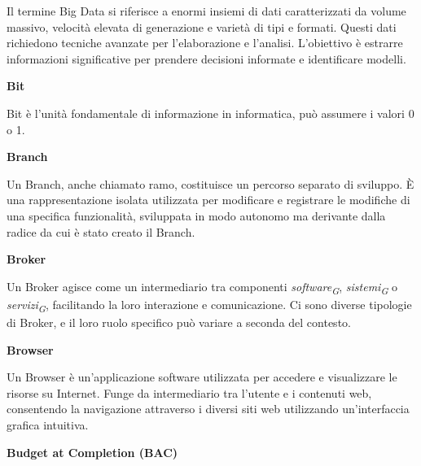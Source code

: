 \documentclass{article}
\begin{document}
Il termine Big Data si riferisce a enormi insiemi di dati caratterizzati da volume massivo, velocità elevata di generazione e varietà di tipi e formati. Questi dati richiedono tecniche avanzate per l'elaborazione e l'analisi. L'obiettivo è estrarre informazioni significative per prendere decisioni informate e identificare modelli.

\vspace{0.4cm}

\textbf{Bit}

\vspace{0.1cm}

Bit è l'unità fondamentale di informazione in informatica, può assumere i valori 0 o 1. 

\vspace{0.4cm}

\textbf{Branch}

\vspace{0.1cm}

Un Branch, anche chiamato ramo, costituisce un percorso separato di sviluppo. È una rappresentazione isolata utilizzata per modificare e registrare le modifiche di una specifica funzionalità, sviluppata in modo autonomo ma derivante dalla radice da cui è stato creato il Branch.

\vspace{0.4cm}

\textbf{Broker}

\vspace{0.1cm}

Un Broker agisce come un intermediario tra componenti \textit{software}\textsubscript{\textit{G}}, \textit{sistemi}\textsubscript{\textit{G}} o \textit{servizi}\textsubscript{\textit{G}}, facilitando la loro interazione e comunicazione. Ci sono diverse tipologie di Broker, e il loro ruolo specifico può variare a seconda del contesto.

\vspace{0.4cm}

\textbf{Browser}

\vspace{0.1cm}

Un Browser è un'applicazione software utilizzata per accedere e visualizzare le risorse su Internet. Funge da intermediario tra l'utente e i contenuti web, consentendo la navigazione attraverso i diversi siti web utilizzando un'interfaccia grafica intuitiva. 

\vspace{0.4cm}

\textbf{Budget at Completion (BAC)}
\end{document}
